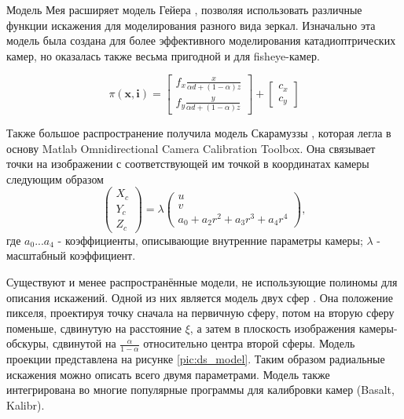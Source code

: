 Модель Мея \cite{mei} расширяет модель Гейера \cite{geyer}, позволяя использовать различные функции искажения 
для моделирования разного вида зеркал. Изначально эта модель была создана для более эффективного моделирования 
катадиоптрических камер, но оказалась также весьма пригодной и для fisheye-камер. 

\begin{equation}
\pi(\mathbf{x}, \mathbf{i})=\left[\begin{array}{l}
	f_{x} \frac{x}{\alpha d+(1-\alpha) z} \\
	f_{y} \frac{y}{\alpha d+(1-\alpha) z}
	\end{array}\right]+\left[\begin{array}{l}
	c_{x} \\
	c_{y}
	\end{array}\right]
\end{equation}

Также большое распространение получила модель Скарамуззы \cite{scaramuzza}, которая легла в основу Matlab Omnidirectional 
Camera Calibration Toolbox. Она связывает точки на изображении с соответствующей им точкой в координатах камеры
следующим образом
\begin{equation}	
    \begin{pmatrix}X_c\\Y_c\\Z_c\end{pmatrix} = \lambda \begin{pmatrix}u\\v\\a_0 + a_2 r^2 + a_3 r^3 + a_4 r^4\end{pmatrix},
    \label{eqn:scaramuzza}
\end{equation}
где $a_0 ... a_4$ - коэффициенты, описывающие внутренние параметры камеры; $\lambda$ - масштабный коэффициент.


Существуют и менее распространённые модели, не использующие полиномы для описания искажений. Одной из них является
модель двух сфер \cite{double_sphere}. %
Она положение пикселя, проектируя точку сначала на первичную сферу, потом на вторую сферу поменьше, сдвинутую на 
расстояние $\xi$, а затем в плоскость изображения камеры-обскуры, сдвинутой на $\frac{\alpha}{1-\alpha}$ относительно 
центра второй сферы. Модель проекции представлена на рисунке \ref{pic:ds_model}. Таким образом радиальные искажения 
можно описать всего двумя параметрами. Модель также интегрирована
во многие популярные программы для калибровки камер (Basalt, Kalibr).




 